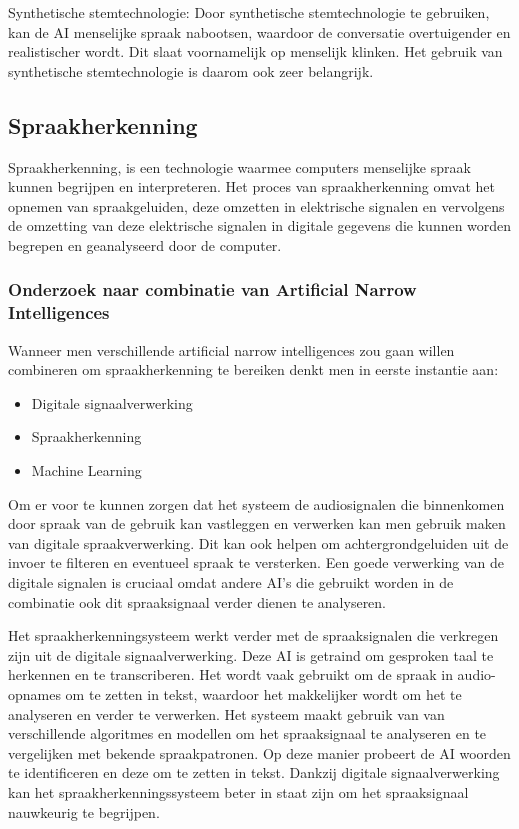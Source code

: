 Synthetische stemtechnologie: Door synthetische stemtechnologie te gebruiken, kan de AI menselijke spraak nabootsen, waardoor de conversatie overtuigender en realistischer wordt. Dit slaat voornamelijk op menselijk klinken. Het gebruik van synthetische stemtechnologie is daarom ook zeer belangrijk.

\newpage

\subsection{Spraakherkenning}

Spraakherkenning, is een technologie waarmee computers menselijke spraak kunnen begrijpen en interpreteren. Het proces van spraakherkenning omvat het opnemen van spraakgeluiden, deze omzetten in elektrische signalen en vervolgens de omzetting van deze elektrische signalen in digitale gegevens die kunnen worden begrepen en geanalyseerd door de computer.

\subsubsection{Onderzoek naar combinatie van Artificial Narrow Intelligences}

Wanneer men verschillende artificial narrow intelligences zou gaan willen combineren om spraakherkenning te bereiken denkt men in eerste instantie aan:

\begin{itemize}
    \item Digitale signaalverwerking
    \item Spraakherkenning
    \item Machine Learning
\end{itemize}

Om er voor te kunnen zorgen dat het systeem de audiosignalen die binnenkomen door spraak van de gebruik kan vastleggen en verwerken kan men gebruik maken van digitale spraakverwerking. Dit kan ook helpen om achtergrondgeluiden uit de invoer te filteren en eventueel spraak te versterken. Een goede verwerking van de digitale signalen is cruciaal omdat andere AI's die gebruikt worden in de combinatie ook dit spraaksignaal verder dienen te analyseren.

Het spraakherkenningsysteem werkt verder met de spraaksignalen die verkregen zijn uit de digitale signaalverwerking. Deze AI is getraind om gesproken taal te herkennen en te transcriberen. Het wordt vaak gebruikt om de spraak in audio-opnames om te zetten in tekst, waardoor het makkelijker wordt om het te analyseren en verder te verwerken. Het systeem maakt gebruik van van verschillende algoritmes en modellen om het spraaksignaal te analyseren en te vergelijken met bekende spraakpatronen. Op deze manier probeert de AI woorden te identificeren en deze om te zetten in tekst. Dankzij digitale signaalverwerking kan het spraakherkenningssysteem beter in staat zijn om het spraaksignaal nauwkeurig te begrijpen.

